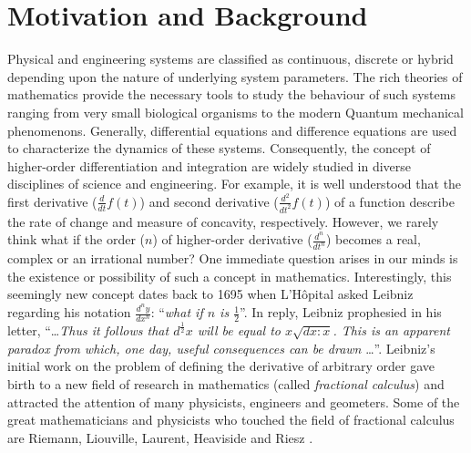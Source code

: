 \documentclass {llncs}
\begin{document}
\section{Motivation and Background}
Physical and engineering systems are classified as continuous, discrete or hybrid depending upon the
nature of underlying system parameters. The rich theories of mathematics provide the necessary tools to study the
behaviour of such systems ranging from very small biological organisms to the modern Quantum mechanical phenomenons.
Generally, differential equations \cite{math_modeling} and difference
equations \cite{diff_eq_book} are used to characterize the dynamics of
these systems. Consequently, the concept
of higher-order differentiation and integration are widely  studied in diverse disciplines of
 science and engineering. For example, it is well understood that the first derivative
($\frac{d}{dt} f(t)$) and
second derivative ($\frac{d^{2}}{dt^{2}} f(t)$) of a function describe the rate of change and measure of concavity, respectively.
However, we rarely think what if the order ($n$) of higher-order derivative
 ($\frac{d^{n}}{dt^{n}}$) becomes a real, complex or an irrational number?
 One immediate question arises in our
 minds is the existence or possibility of such a concept in mathematics. Interestingly, this seemingly new concept
 dates back to 1695 when L'H\^{o}pital asked Leibniz regarding his notation $\frac{d^n y}{dx^n}$: ``{\em what if $n$ is $\frac{1}{2}$}''.
 In reply, Leibniz \cite{Le_1} prophesied in his letter,
 ``\ldots \textit{Thus it follows that ${d^{\frac{1}{2}} x}$ will be equal to $ x\sqrt{dx:x} $. This is an apparent paradox from which, one
 day, useful consequences can be drawn} \ldots''.
Leibniz's initial work
on the problem of defining the derivative of arbitrary order
gave birth to a new field of research in mathematics (called \textit{fractional calculus}) and
attracted the attention of many  physicists, engineers
and geometers. Some of the  great mathematicians
and physicists who touched the field of fractional calculus
are Riemann, Liouville, Laurent, Heaviside and  Riesz \cite{B2_93}.
\end{document}
